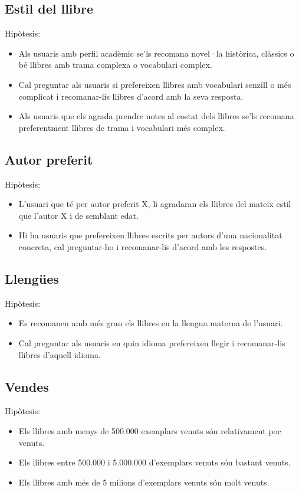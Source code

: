 \subsection{Estil del llibre}
Hipòtesis:
\begin{itemize}
  \item Als usuaris amb perfil acadèmic se'ls recomana novel·la històrica, clàssics o bé llibres amb trama complexa o vocabulari complex.
  \item Cal preguntar als usuaris si prefereixen llibres amb vocabulari senzill o més complicat i recomanar-lis llibres d'acord amb la seva resposta.
  \item Als usuaris que els agrada prendre notes al costat dels llibres se'ls recomana preferentment llibres de trama i vocabulari més complex.
\end{itemize}

\subsection{Autor preferit}
Hipòtesis:
\begin{itemize}
  \item L'usuari que té per autor preferit X, li agradaran els llibres del mateix estil que l'autor X i de semblant edat.
  \item Hi ha usuaris que prefereixen llibres escrits per autors d'una nacionalitat concreta, cal preguntar-ho i recomanar-lis d'acord amb les respostes.
\end{itemize}

\subsection{Llengües}
Hipòtesis:
\begin{itemize}
  \item Es recomanen amb més grau els llibres en la llengua materna de l'usuari.
  \item Cal preguntar als usuaris en quin idioma prefereixen llegir i recomanar-lis llibres d'aquell idioma.
\end{itemize}

\subsection{Vendes}
Hipòtesis:
\begin{itemize}
  \item Els llibres amb menys de 500.000 exemplars venuts són relativament poc venuts.
  \item Els llibres entre 500.000 i 5.000.000 d'exemplars venuts són bastant venuts.
  \item Els llibres amb més de 5 milions d'exemplars venuts són molt venuts.
\end{itemize}


